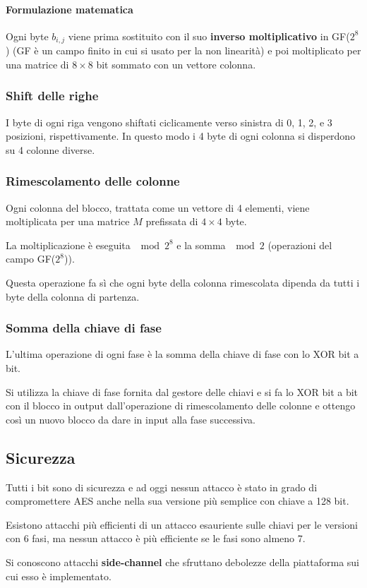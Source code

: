 \paragraph{Formulazione matematica}
Ogni byte $b_{i, j}$ viene prima sostituito con il suo \textbf{inverso moltiplicativo} in GF($2^8$) (GF \`e un campo
finito in cui si usato per la non linearit\`a) e poi moltiplicato per una matrice di $8 \times 8$ bit sommato con un
vettore colonna.

\subsubsection{Shift delle righe}
I byte di ogni riga vengono shiftati ciclicamente verso sinistra di 0, 1, 2, e 3 posizioni, rispettivamente. In questo
modo i 4 byte di ogni colonna si disperdono su 4 colonne diverse.

\subsubsection{Rimescolamento delle colonne}
Ogni colonna del blocco, trattata come un vettore di 4 elementi, viene moltiplicata per una matrice $M$ prefissata di
$4 \times 4$ byte.

La moltiplicazione \`e eseguita $\mod{2^8}$ e la somma $\mod{2}$ (operazioni del campo GF($2^8$)).

Questa operazione fa s\`i che ogni byte della colonna rimescolata dipenda da tutti i byte della colonna di partenza.

\subsubsection{Somma della chiave di fase}
L'ultima operazione di ogni fase \`e la somma della chiave di fase con lo XOR bit a bit.

Si utilizza la chiave di fase fornita dal gestore delle chiavi e si fa lo XOR bit a bit con il blocco in output
dall'operazione di rimescolamento delle colonne e ottengo cos\`i un nuovo blocco da dare in input alla fase successiva.

\subsection{Sicurezza}
Tutti i bit sono di sicurezza e ad oggi nessun attacco \`e stato in grado di compromettere AES anche nella sua versione
pi\`u semplice con chiave a 128 bit.

Esistono attacchi pi\`u efficienti di un attacco esauriente sulle chiavi per le versioni con 6 fasi, ma nessun attacco
\`e pi\`u efficiente se le fasi sono almeno 7.

Si conoscono attacchi \textbf{side-channel} che sfruttano debolezze della piattaforma sui cui esso \`e implementato.